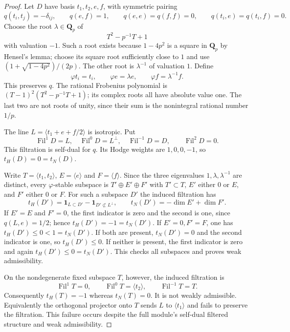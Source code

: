 \documentclass[11pt]{article}
\theoremstyle{remark}\newtheorem{remark}[theorem]{Remark}
\begin{document}
\begin{proof}
Let $D$ have basis $t_1,t_2,e,f$, with symmetric pairing
\[
 q(t_i,t_j)=-\delta_{ij},\qquad q(e,f)=1,
 \qquad q(e,e)=q(f,f)=0,
 \qquad q(t_i,e)=q(t_i,f)=0.
\]
Choose the root $\lambda\in\mathbf Q_p$ of
\[
                       T^2-p^{-1}T+1
 \tag{A17.6}
\]
with valuation $-1$. Such a root exists because
$1-4p^2$ is a square in $\mathbf Q_p$ by Hensel's lemma;
choose its square root sufficiently close to $1$ and use
$(1+\sqrt{1-4p^2})/(2p)$. The other root is
$\lambda^{-1}$ of valuation $1$. Define
\[
 \varphi t_i=t_i,\qquad \varphi e=\lambda e,
 \qquad \varphi f=\lambda^{-1}f.
\]
This preserves $q$. The rational Frobenius polynomial is
$(T-1)^2(T^2-p^{-1}T+1)$; its complex roots all have
absolute value one. The last two are not roots of unity,
since their sum is the nonintegral rational number $1/p$.

The line $L=\langle t_1+e+f/2\rangle$ is isotropic.
Put
\[
 \operatorname{Fil}^1D=L,\quad
 \operatorname{Fil}^0D=L^\perp,\quad
 \operatorname{Fil}^{-1}D=D,
 \qquad \operatorname{Fil}^2D=0.
 \tag{A17.7}
\]
This filtration is self-dual for $q$. Its Hodge weights
are $1,0,0,-1$, so $t_H(D)=0=t_N(D)$.

Write $T=\langle t_1,t_2\rangle$, $E=\langle e\rangle$
and $F=\langle f\rangle$. Since the three eigenvalues
$1,\lambda,\lambda^{-1}$ are distinct, every
$\varphi$-stable subspace is $T'\oplus E'\oplus F'$
with $T'\subset T$, $E'$ either $0$ or $E$, and $F'$
either $0$ or $F$. For such a subspace $D'$ the induced
filtration has
\[
 t_H(D')=\mathbf1_{L\subset D'}-
                    \mathbf1_{D'\not\subset L^\perp},
 \qquad
 t_N(D')=-\dim E'+\dim F'.
 \tag{A17.8}
\]
If $E'=E$ and $F'=0$, the first indicator is zero and
the second is one, since $q(L,e)=1/2$; hence
$t_H(D')=-1=t_N(D')$. If $E'=0,F'=F$, one has
$t_H(D')\leq0<1=t_N(D')$. If both are present,
$t_N(D')=0$ and the second indicator is one, so
$t_H(D')\leq0$. If neither is present, the first
indicator is zero and again $t_H(D')\leq0=t_N(D')$.
This checks all subspaces and proves weak admissibility.

On the nondegenerate fixed subspace $T$, however, the
induced filtration is
\[
 \operatorname{Fil}^1T=0,\qquad
 \operatorname{Fil}^0T=\langle t_2\rangle,
 \qquad\operatorname{Fil}^{-1}T=T.
\]
Consequently $t_H(T)=-1$ whereas $t_N(T)=0$.
It is not weakly admissible. Equivalently the orthogonal
projector onto $T$ sends $L$ to $\langle t_1\rangle$
and fails to preserve the filtration. This failure
occurs despite the full module's self-dual filtered
structure and weak admissibility.
\end{proof}
\end{document}
